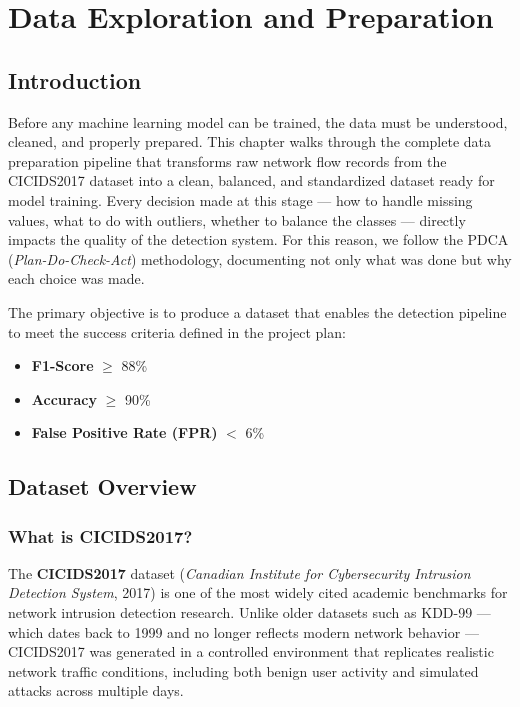 
\chapter{Data Exploration and Preparation}

\section{Introduction}

Before any machine learning model can be trained, the data must be understood, cleaned, and properly prepared. This chapter walks through the complete data preparation pipeline that transforms raw network flow records from the CICIDS2017 dataset into a clean, balanced, and standardized dataset ready for model training. Every decision made at this stage --- how to handle missing values, what to do with outliers, whether to balance the classes --- directly impacts the quality of the detection system. For this reason, we follow the PDCA (\textit{Plan-Do-Check-Act}) methodology, documenting not only what was done but why each choice was made.

The primary objective is to produce a dataset that enables the detection pipeline to meet the success criteria defined in the project plan:
\begin{itemize}
    \item \textbf{F1-Score} $\geq$ 88\%
    \item \textbf{Accuracy} $\geq$ 90\%
    \item \textbf{False Positive Rate (FPR)} $<$ 6\%
\end{itemize}

\section{Dataset Overview}

\subsection{What is CICIDS2017?}

The \textbf{CICIDS2017} dataset (\textit{Canadian Institute for Cybersecurity Intrusion Detection System}, 2017) is one of the most widely cited academic benchmarks for network intrusion detection research. Unlike older datasets such as KDD-99 --- which dates back to 1999 and no longer reflects modern network behavior --- CICIDS2017 was generated in a controlled environment that replicates realistic network traffic conditions, including both benign user activity and simulated attacks across multiple days.

